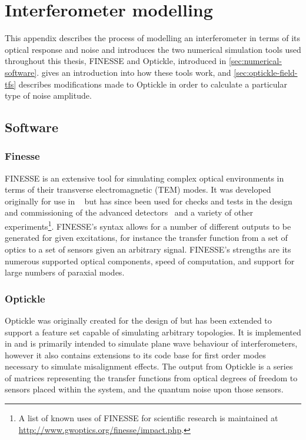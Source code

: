 \chapter{\label{a:simulation-tools}Interferometer modelling}
This appendix describes the process of modelling an interferometer in terms of its optical response and noise and introduces the two numerical simulation tools used throughout this thesis, \gls{FINESSE} and Optickle, introduced in \cref{sec:numerical-software}.  gives an introduction into how these tools work, and \cref{sec:optickle-field-tfs} describes modifications made to Optickle in order to calculate a particular type of noise amplitude.

\section{\label{sec:numerical-software}Software}
\subsection{\label{sec:finesse-sim}Finesse}
\gls{FINESSE} is an extensive tool for simulating complex optical environments in terms of their transverse electromagnetic (\gls{TEM}) modes. It was developed originally for use in \GEO{}~\cite{Freise2004} but has since been used for checks and tests in the design and commissioning of the advanced detectors~\cite{Mueller2015, Kumeta2015} and a variety of other experiments\footnote{A list of known uses of \gls{FINESSE} for scientific research is maintained at \url{http://www.gwoptics.org/finesse/impact.php}.}. \gls{FINESSE}'s syntax allows for a number of different outputs to be generated for given excitations, for instance the transfer function from a set of optics to a set of sensors given an arbitrary signal. \gls{FINESSE}'s strengths are its numerous supported optical components, speed of computation, and support for large numbers of paraxial modes.

\subsection{\label{sec:optickle-sim}Optickle}
Optickle was originally created for the design of \ALIGO{} but has been extended to support a feature set capable of simulating arbitrary topologies. It is implemented in \MATLAB{} and is primarily intended to simulate plane wave behaviour of interferometers, however it also contains extensions to its code base for first order modes necessary to simulate misalignment effects. The output from Optickle is a series of matrices representing the transfer functions from optical degrees of freedom to sensors placed within the system, and the quantum noise upon those sensors.

